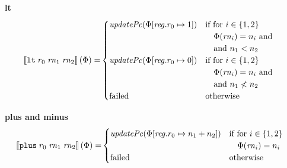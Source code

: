 \documentclass[a3paper]{article}
\newcommand{\sem}[1]{\left\llbracket #1 \right\rrbracket}
\newcommand{\tand}{\text{ and }}
\newcommand{\targetcolor}[1]{\color{black}}
\newcommand{\trg}[1]{{\targetcolor{} #1}}
\newcommand{\zinstr}[1]{\texttt{#1}}
\newcommand{\threeinstr}[4]{
  \ifthenelse{\equal{#2#3#4}{}}
  {\zinstr{#1}}
  {\zinstr{#1} \; #2 \; #3 \; #4}
}
\newcommand{\tlt}[3]{\threeinstr{\trg{lt}}{#1}{#2}{#3}}
\newcommand{\tplus}[3]{\threeinstr{\trg{plus}}{#1}{#2}{#3}}
\newcommand{\update}[2]{[#1 \mapsto #2]}
\newcommand{\updReg}[2]{\update{\reg.#1}{#2}}
\newcommand{\failed}{\mathrm{failed}}
\newcommand{\var}[1]{\mathit{#1}}
\newcommand{\rn}{\var{rn}}
\newcommand{\reg}{\var{reg}}
\newcommand{\plainfun}[2]{
  \ifthenelse{\equal{#2}{}}
  {\mathit{#1}}
  {\mathit{#1}(#2)}
}
\newcommand{\updPcAddr}[1]{\plainfun{updatePc}{#1}}
\begin{document}
\noindent\textbf{lt}\\
\begin{align*}
  \sem{\tlt{r_0}{\rn_1}{\rn_2}}(\Phi) = &
                                                  \begin{cases}
                                                    \updPcAddr{\Phi\updReg{r_0}{1}} &
                                                    \arraycolsep=0pt
                                                    \begin{array}[t]{l}
                                                      \text{if for $i \in \{1,2\}$}\\
                                                      \quad\Phi(\rn_i) = n_i \tand\\
                                                      \quad\text{and $n_1 < n_2$}\\        
                                                    \end{array}\\
                                                    \updPcAddr{\Phi\updReg{r_0}{0}} &
                                                    \arraycolsep=0pt
                                                    \begin{array}[t]{l}
                                                      \text{if for $i \in \{1,2\}$}\\
                                                      \quad \Phi(\rn_i) = n_i \tand \\
                                                      \quad\text{and $n_1 \not< n_2$}\\        
                                                    \end{array}\\
                                                    \failed & \text{otherwise}
                                                  \end{cases}  
\end{align*}

\noindent\textbf{plus and minus}\\
\begin{align*}
  \sem{\tplus{r_0}{\rn_1}{\rn_2}}(\Phi) = &
                                                  \begin{cases}
                                                    \updPcAddr{\Phi\updReg{r_0}{n_1+n_2}} &
                                                    \arraycolsep=0pt
                                                    \begin{array}[t]{l}
                                                      \text{if for $i \in \{1,2\}$}\\
                                                      \quad \Phi(\rn_i) = n_i\\
                                                    \end{array}\\
                                                    \failed & \text{otherwise}
                                                  \end{cases}  
\end{align*}
\end{document}
